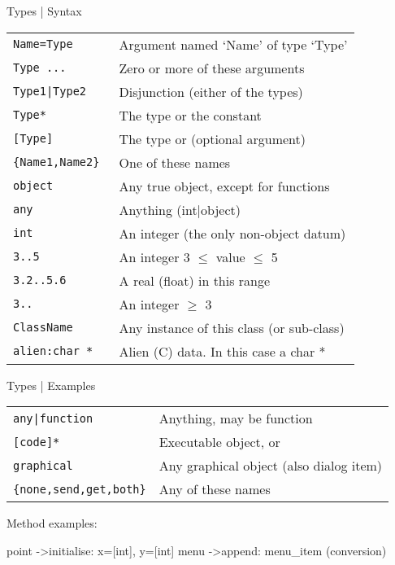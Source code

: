 \begin{sli}{Types | Syntax}

\begin{tabular}{ll}
\tt Name=Type		&Argument named `Name' of type `Type' \\
\tt Type ...		&Zero or more of these arguments \\
\verb$Type1|Type2$	&Disjunction (either of the types) \\
\tt Type*		&The type or the constant \index{@nil}\objectname{nil} \\
\tt [Type]		&The type or \index{@default}\objectname{default} (optional argument) \\
\tt \{Name1,Name2\}	&One of these names \\
\tt object		&Any true object, except for functions \\
\tt any			&Anything (int|object) \\
\tt int			&An integer (the only non-object datum) \\
\tt 3..5		&An integer 3 $\leq$ value $\leq$ 5 \\
\tt 3.2..5.6		&A real (float) in this range \\
\tt 3..			&An integer $\geq$ 3 \\
\tt ClassName		&Any instance of this class (or sub-class) \\
\tt alien:char *	&Alien (C) data.  In this case a char *
\end{tabular}

\end{sli}

\begin{sli}{Types | Examples}

\begin{tabular}{ll}
\verb$any|function$		&Anything, may be function \\
\verb$[code]*$			&Executable object, \index{@default}\objectname{default} or \index{@nil}\objectname{nil} \\
\verb$graphical$		&Any graphical object (also dialog item) \\
\verb${none,send,get,both}$	&Any of these names \\
\end{tabular}


Method examples:

\begin{code}
point ->initialise: x=[int], y=[int]
menu ->append: menu_item                (conversion)
\end{code}

\noindent
\end{sli}


